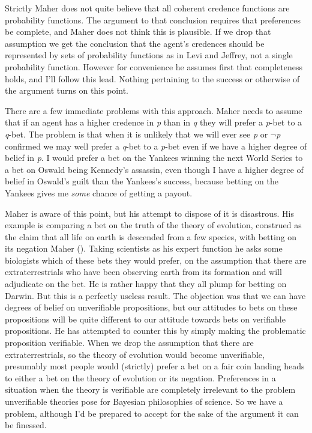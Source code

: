 \documentclass[
  11pt,
  letterpaper,
  DIV=11,
  numbers=noendperiod,
  twoside]{scrartcl}
\begin{document}
Strictly Maher does not quite believe that all coherent credence
functions are probability functions. The argument to that conclusion
requires that preferences be complete, and Maher does not think this is
plausible. If we drop that assumption we get the conclusion that the
agent's credences should be represented by sets of probability functions
as in Levi and Jeffrey, not a single probability function. However for
convenience he assumes first that completeness holds, and I'll follow
this lead. Nothing pertaining to the success or otherwise of the
argument turns on this point.

There are a few immediate problems with this approach. Maher needs to
assume that if an agent has a higher credence in \emph{p} than in
\emph{q} they will prefer a \emph{p}-bet to a \emph{q}-bet. The problem
is that when it is unlikely that we will ever see \emph{p} or
\({\lnot}\)\emph{p} confirmed we may well prefer a \emph{q}-bet to a
\emph{p}-bet even if we have a higher degree of belief in \emph{p}. I
would prefer a bet on the Yankees winning the next World Series to a bet
on Oswald being Kennedy's assassin, even though I have a higher degree
of belief in Oswald's guilt than the Yankees's success, because betting
on the Yankees gives me \emph{some} chance of getting a payout.

Maher is aware of this point, but his attempt to dispose of it is
disastrous. His example is comparing a bet on the truth of the theory of
evolution, construed as the claim that all life on earth is descended
from a few species, with betting on its negation Maher
(). Taking scientists as his expert
function he asks some biologists which of these bets they would prefer,
on the assumption that there are extraterrestrials who have been
observing earth from its formation and will adjudicate on the bet. He is
rather happy that they all plump for betting on Darwin. But this is a
perfectly useless result. The objection was that we can have degrees of
belief on unverifiable propositions, but our attitudes to bets on these
propositions will be quite different to our attitude towards bets on
verifiable propositions. He has attempted to counter this by simply
making the problematic proposition verifiable. When we drop the
assumption that there are extraterrestrials, so the theory of evolution
would become unverifiable, presumably most people would (strictly)
prefer a bet on a fair coin landing heads to either a bet on the theory
of evolution or its negation. Preferences in a situation when the theory
is verifiable are completely irrelevant to the problem unverifiable
theories pose for Bayesian philosophies of science. So we have a
problem, although I'd be prepared to accept for the sake of the argument
it can be finessed.
\end{document}

